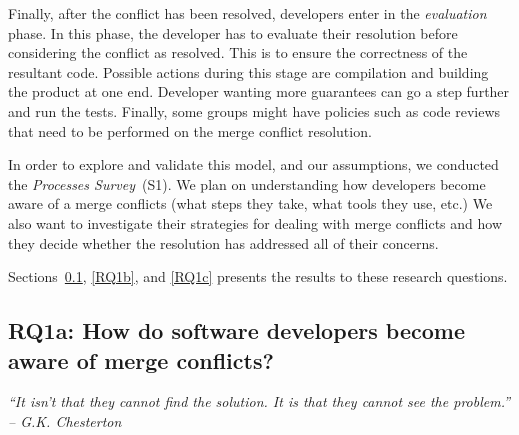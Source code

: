 Finally, after the conflict has been resolved, developers enter in the \emph{evaluation} phase.
In this phase, the developer has to evaluate their resolution before considering the conflict as resolved.
This is to ensure the correctness of the resultant code.
Possible actions during this stage are compilation and building the product at one end.
Developer wanting more guarantees can go a step further and run the tests.
Finally, some groups might have policies such as code reviews that need to be performed on the merge conflict resolution.
 
In order to explore and validate this model, and our assumptions, we conducted the \emph{Processes Survey}~(S1).
We plan on understanding how developers become aware of a merge conflicts (what steps they take, what tools they use, etc.)
We also want to investigate their strategies for dealing with merge conflicts and how they decide whether the resolution has addressed all of their concerns.

Sections~\ref{RQ1a}, \ref{RQ1b}, and \ref{RQ1c} presents the results to these research questions.

\subsection{\textbf{RQ1a:} How do software developers become aware of merge conflicts?}\label{RQ1a}
\vspace*{-0.5\baselineskip}
\begin{quoting}
\textit{``It isn't that they cannot find the solution. It is that they cannot see the problem.'' -- G.K. Chesterton}
\end{quoting}
\vspace*{+0.3\baselineskip}

